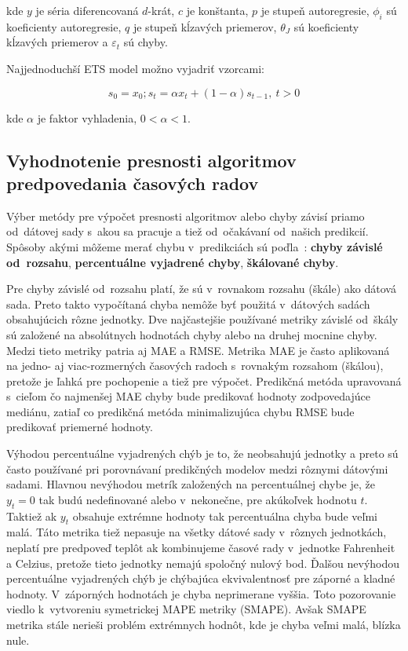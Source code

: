 \documentclass[thesismargins, thesislinespacing, openright, upjsfrontpage]{rnthesis}
\begin{document}
kde $y$ je séria diferencovaná $d$-krát, $c$ je konštanta, $p$ je stupeň autoregresie, $\phi_i$ sú koeficienty autoregresie, $q$ je stupeň kĺzavých priemerov, $\theta_J$ sú koeficienty kĺzavých priemerov a $\varepsilon_t$ sú chyby.

Najjednoduchší ETS model možno vyjadriť vzorcami:

\begin{equation}
s_{0} = x_{0}; s_{t} = \alpha x_{t}+(1-\alpha )s_{t-1},\ t>0
\end{equation}

kde $\alpha$ je faktor vyhladenia, $0<\alpha <1$.

\subsection{Vyhodnotenie presnosti algoritmov predpovedania časových radov}

Výber metódy pre výpočet presnosti algoritmov alebo chyby závisí priamo od~dátovej sady s~akou sa pracuje a tiež od~očakávaní od~našich predikcií. Spôsoby akými môžeme merať chybu v~predikciách sú poďla~\cite{hyndman2018forecasting}:  \textbf{chyby závislé od~rozsahu}, \textbf{percentuálne vyjadrené chyby},  \textbf{škálované chyby}. 

Pre chyby závislé od~rozsahu platí, že sú v~rovnakom rozsahu (škále) ako dátová sada. Preto takto vypočítaná chyba nemôže byť použitá v~dátových sadách obsahujúcich rôzne jednotky. Dve najčastejšie používané metriky závislé od~škály sú založené na absolútnych hodnotách chyby alebo na druhej mocnine chyby. Medzi tieto metriky patria aj MAE a RMSE. Metrika MAE je často aplikovaná na jedno- aj viac-rozmerných časových radoch s~rovnakým rozsahom (škálou), pretože je ľahká pre pochopenie a tiež pre výpočet. Predikčná metóda upravovaná s~cieľom čo najmenšej MAE chyby bude predikovať hodnoty zodpovedajúce mediánu, zatiaľ co predikčná metóda minimalizujúca chybu RMSE bude predikovať priemerné hodnoty. 

Výhodou percentuálne vyjadrených chýb je to, že neobsahujú jednotky a preto sú často používané pri porovnávaní predikčných modelov medzi rôznymi dátovými sadami. Hlavnou nevýhodou metrík založených na percentuálnej chybe je, že $y_{t} = 0$ tak budú nedefinované alebo v~nekonečne, pre akúkoľvek hodnotu $t$. Taktiež ak $y_{t}$ obsahuje extrémne hodnoty tak percentuálna chyba bude veľmi malá. Táto metrika tiež nepasuje na všetky dátové sady v~rôznych jednotkách, neplatí pre predpoveď teplôt ak kombinujeme časové rady v~jednotke Fahrenheit a Celzius, pretože tieto jednotky nemajú spoločný nulový bod. Ďalšou nevýhodou percentuálne vyjadrených chýb je chýbajúca ekvivalentnosť pre záporné a kladné hodnoty. V~záporných hodnotách je chyba neprimerane vyššia. Toto pozorovanie viedlo k~vytvoreniu symetrickej MAPE metriky \cite{armstrong1985crystal} (SMAPE). Avšak SMAPE metrika stále nerieši problém extrémnych hodnôt, kde je chyba veľmi malá, blízka nule. 
\end{document}
